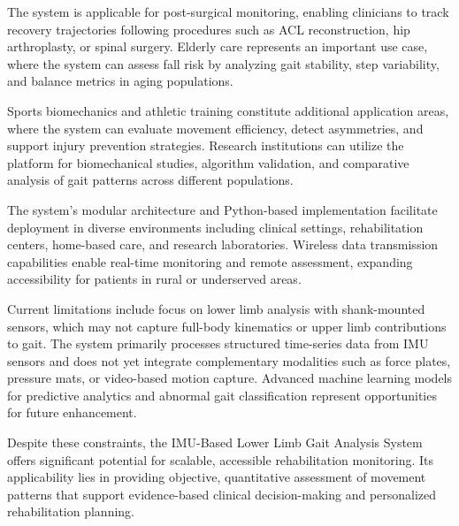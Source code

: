 \documentclass[12pt,a4paper]{report}
\begin{document}
The system is applicable for post-surgical monitoring, enabling clinicians to track recovery trajectories following procedures such as ACL reconstruction, hip arthroplasty, or spinal surgery. Elderly care represents an important use case, where the system can assess fall risk by analyzing gait stability, step variability, and balance metrics in aging populations.

Sports biomechanics and athletic training constitute additional application areas, where the system can evaluate movement efficiency, detect asymmetries, and support injury prevention strategies. Research institutions can utilize the platform for biomechanical studies, algorithm validation, and comparative analysis of gait patterns across different populations.

The system's modular architecture and Python-based implementation facilitate deployment in diverse environments including clinical settings, rehabilitation centers, home-based care, and research laboratories. Wireless data transmission capabilities enable real-time monitoring and remote assessment, expanding accessibility for patients in rural or underserved areas.

Current limitations include focus on lower limb analysis with shank-mounted sensors, which may not capture full-body kinematics or upper limb contributions to gait. The system primarily processes structured time-series data from IMU sensors and does not yet integrate complementary modalities such as force plates, pressure mats, or video-based motion capture. Advanced machine learning models for predictive analytics and abnormal gait classification represent opportunities for future enhancement.

Despite these constraints, the IMU-Based Lower Limb Gait Analysis System offers significant potential for scalable, accessible rehabilitation monitoring. Its applicability lies in providing objective, quantitative assessment of movement patterns that support evidence-based clinical decision-making and personalized rehabilitation planning.

\setcounter{chapter}{2}
\clearpage
\thispagestyle{empty}

\noindent
{}
\end{document}
